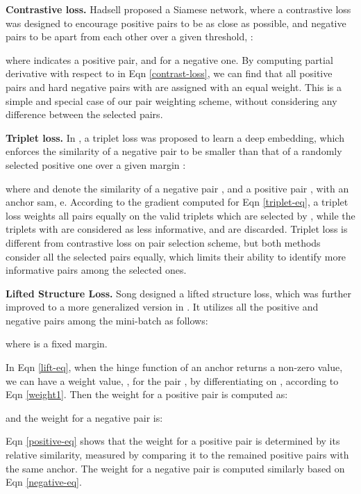 \documentclass[10pt,twocolumn,letterpaper]{article}
\begin{document}
{\bf Contrastive loss.} Hadsell \etal \cite{contrastive} proposed a Siamese network, where a contrastive loss was designed to encourage positive pairs to be as close as possible, and negative pairs to be apart from each other over a given threshold, :

where  indicates a positive pair, and  for a negative one.
By computing partial derivative with respect to  in Eqn \ref{contrast-loss}, we can find that all positive pairs and hard negative pairs with  are assigned with an equal weight. This is a simple and special case of our pair weighting scheme, without considering any difference between the selected pairs.

{\bf Triplet loss.}
In \cite{Hoffer2015DeepML}, a triplet loss was proposed to learn a deep embedding, which enforces the similarity of a negative pair to be smaller than that of a randomly selected positive one over a given margin :

where  and  denote the similarity of a negative pair , and a positive pair , with an anchor sam, e.
According to the gradient computed for Eqn \ref{triplet-eq}, a triplet loss weights all pairs equally on the valid triplets which are selected by , while the triplets with  are considered as less informative, and are discarded. Triplet loss is different from contrastive loss on pair selection scheme, but both methods consider all the selected pairs equally, which limits their ability to identify more informative pairs among the selected ones.

{\bf Lifted Structure Loss.} Song \etal \cite{lifted-structured-loss} designed a lifted structure loss, which was further improved to  a more generalized version in \cite{in-defense}. It utilizes all the positive and negative pairs among the mini-batch as follows:

where  is a fixed margin.

In Eqn \ref{lift-eq}, when the hinge function of an anchor 
returns a non-zero value, we can have a weight value,  , for the pair
,  by differentiating  on , according to Eqn \ref{weight1}. Then the weight for a positive pair is computed as:

and the weight for a negative pair is:

Eqn \ref{positive-eq} shows that the weight for a positive pair is determined by its relative similarity, measured by comparing it to the remained positive pairs with the same anchor. The weight for a negative pair is computed similarly based on Eqn \ref{negative-eq}.
\end{document}
